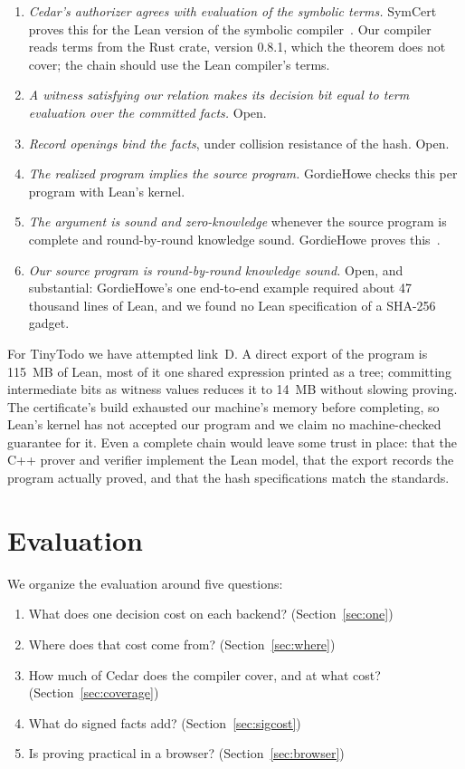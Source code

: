 \documentclass[11pt]{article}
\begin{document}
\begin{enumerate}[label=\textbf{\Alph*.}]
\item \emph{Cedar's authorizer agrees with evaluation of the symbolic terms.} SymCert proves this for the Lean version of the symbolic compiler~\citep{torlak2026symcert}. Our compiler reads terms from the Rust crate, version 0.8.1, which the theorem does not cover; the chain should use the Lean compiler's terms.
\item \emph{A witness satisfying our relation makes its decision bit equal to term evaluation over the committed facts.} Open.
\item \emph{Record openings bind the facts}, under collision resistance of the hash. Open.
\item \emph{The realized program implies the source program.} GordieHowe checks this per program with Lean's kernel.
\item \emph{The argument is sound and zero-knowledge} whenever the source program is complete and round-by-round knowledge sound. GordieHowe proves this~\citep{sharp2026gordiehowe}.
\item \emph{Our source program is round-by-round knowledge sound.} Open, and substantial: GordieHowe's one end-to-end example required about 47 thousand lines of Lean, and we found no Lean specification of a SHA-256 gadget.
\end{enumerate}

For TinyTodo we have attempted link~D. A direct export of the program is 115~MB of Lean, most of it one shared expression printed as a tree; committing intermediate bits as witness values reduces it to 14~MB without slowing proving. The certificate's build exhausted our machine's memory before completing, so Lean's kernel has not accepted our program and we claim no machine-checked guarantee for it. Even a complete chain would leave some trust in place: that the C++ prover and verifier implement the Lean model, that the export records the program actually proved, and that the hash specifications match the standards.


\section{Evaluation}
\label{sec:eval}

We organize the evaluation around five questions:
\begin{enumerate}[label=\textbf{Q\arabic*.}]
\item What does one decision cost on each backend? (Section~\ref{sec:one})
\item Where does that cost come from? (Section~\ref{sec:where})
\item How much of Cedar does the compiler cover, and at what cost? (Section~\ref{sec:coverage})
\item What do signed facts add? (Section~\ref{sec:sigcost})
\item Is proving practical in a browser? (Section~\ref{sec:browser})
\end{enumerate}
\end{document}
